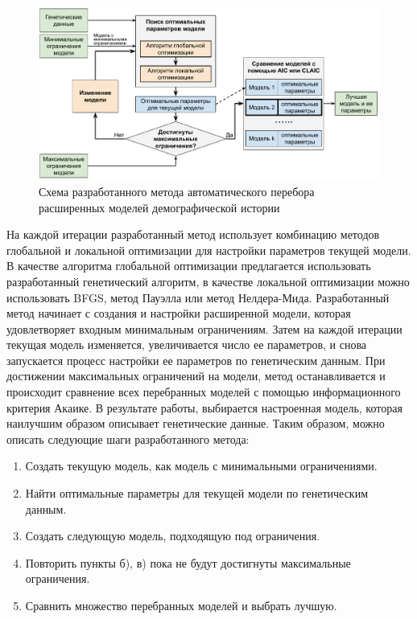 \documentclass[a4paper,14pt,oneside,openany,article]{memoir}
\begin{document}
\begin{figure}[h!]
    \centering
    \includegraphics[width=0.9\linewidth]{images_2/general_scheme_rus.pdf}
    \caption{Схема разработанного метода автоматического перебора расширенных моделей демографической истории}
    \label{fig:auto:scheme}
\end{figure}

На каждой итерации разработанный метод использует комбинацию методов глобальной и локальной оптимизации для настройки параметров текущей модели.
В качестве алгоритма глобальной оптимизации предлагается использовать разработанный генетический алгоритм, в качестве локальной оптимизации можно использовать BFGS, метод Пауэлла или метод Нелдера-Мида.
Разработанный метод начинает с создания и настройки расширенной модели, которая удовлетворяет входным минимальным ограничениям.
Затем на каждой итерации текущая модель изменяется, увеличивается число ее параметров, и снова запускается процесс настройки ее параметров по генетическим данным.
При достижении максимальных ограничений на модели, метод останавливается и происходит сравнение всех перебранных моделей с помощью информационного критерия Акаике.
В результате работы, выбирается настроенная модель, которая наилучшим образом описывает генетические данные.
Таким образом, можно описать следующие шаги разработанного метода:
\begin{enumerate}
    \item Создать текущую модель, как модель с минимальными ограничениями.
    \item Найти оптимальные параметры для текущей модели по генетическим данным.
    \item Создать следующую модель, подходящую под ограничения.
    \item Повторить пункты б), в) пока не будут достигнуты максимальные ограничения.
    \item Сравнить множество перебранных моделей и выбрать лучшую.\\
\end{enumerate}
\end{document}
